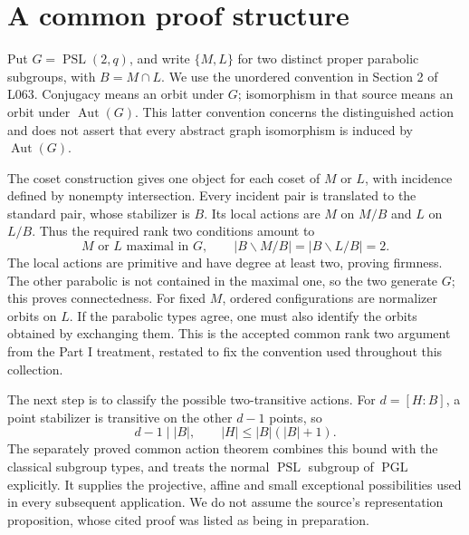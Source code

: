 \documentclass[11pt]{article}
\newcommand{\PSL}{\operatorname{PSL}}\newcommand{\PGL}{\operatorname{PGL}}
\newcommand{\Aut}{\operatorname{Aut}}\newcommand{\F}{\mathbb F}
\begin{document}
\section{A common proof structure}
Put $G=\PSL(2,q)$, and write $\{M,L\}$ for two distinct proper
parabolic subgroups, with $B=M\cap L$. We use the unordered convention
in Section 2 of L063. Conjugacy means an orbit under $G$; isomorphism
in that source means an orbit under $\Aut(G)$. This latter convention
concerns the distinguished action and does not assert that every abstract
graph isomorphism is induced by $\Aut(G)$.

The coset construction gives one object for each coset of $M$ or $L$,
with incidence defined by nonempty intersection. Every incident pair
is translated to the standard pair, whose stabilizer is $B$. Its local
actions are $M$ on $M/B$ and $L$ on $L/B$. Thus the required rank two
conditions amount to
\[
 M\text{ or }L\text{ maximal in }G,
 \qquad |B\backslash M/B|=|B\backslash L/B|=2.
\]
The local actions are primitive and have degree at least two, proving
firmness. The other parabolic is not contained in the maximal one, so
the two generate $G$; this proves connectedness. For fixed $M$, ordered
configurations are normalizer orbits on $L$. If the parabolic types agree,
one must also identify the orbits obtained by exchanging them. This is
the accepted common rank two argument from the Part I treatment, restated
to fix the convention used throughout this collection.

The next step is to classify the possible two-transitive actions. For
$d=[H:B]$, a point stabilizer is transitive on the other $d-1$ points,
so
\[
 d-1\mid |B|,\qquad |H|\le |B|(|B|+1).
\]
The separately proved common action theorem combines this bound with
the classical subgroup types, and treats the normal $\PSL$ subgroup of
$\PGL$ explicitly. It supplies the projective, affine and small
exceptional possibilities used in every subsequent application. We do
not assume the source's representation proposition, whose cited proof
was listed as being in preparation.
\end{document}
